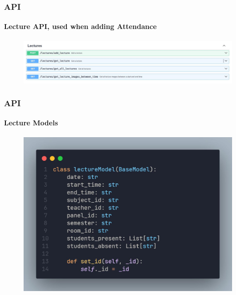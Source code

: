 \documentclass[aspectratio=169]{beamer}
\begin{document}
\begin{frame}
	\centering
	\frametitle{API}
	\framesubtitle{Lecture API, used when adding Attendance}
	\begin{minipage}{0.95\textwidth}
		\begin{figure}[H]
			\centering
			\includegraphics[width=.95\textwidth]{swagger 8.jpg}
		\end{figure}
	\end{minipage}
\end{frame}
\begin{frame}
	\centering
	\frametitle{API}
	\framesubtitle{Lecture Models}
	\begin{minipage}{0.95\textwidth}
		\begin{figure}[H]
			\centering
			\includegraphics[width=.95\textwidth]{lecture.jpg}
		\end{figure}
	\end{minipage}
\end{frame}
\end{document}
